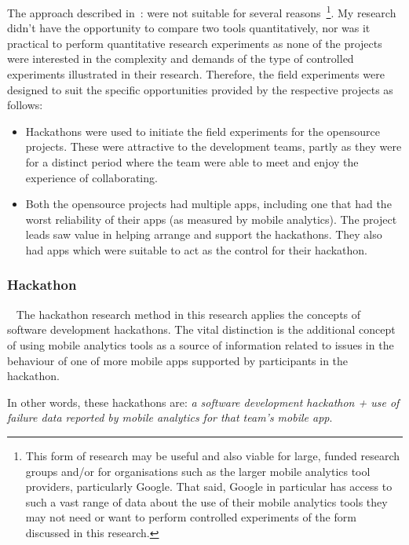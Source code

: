 The approach described in~\citep{Ko2015_a_practical_guide_to_controlled_experiments_of_sw_eng_tools_with_human_participants}: were not suitable for several reasons~\footnote{This form of research may be useful and also viable for large, funded research groups and/or for organisations such as the larger mobile analytics tool providers, particularly Google. That said, Google in particular has access to such a vast range of data about the use of their mobile analytics tools they may not need or want to perform controlled experiments of the form discussed in this research.}. 
%
My research didn't have the opportunity to compare two tools quantitatively, nor was it practical to perform quantitative research experiments as none of the projects were interested in the complexity and demands of the type of controlled experiments illustrated in their research. Therefore, the field experiments were designed to suit the specific opportunities provided by the respective projects as follows:
\begin{itemize}
    \item Hackathons were used to initiate the field experiments for the opensource projects. These were attractive to the development teams, partly as they were for a distinct period where the team were able to meet and enjoy the experience of collaborating.
    \item Both the opensource projects had multiple apps, including one that had the worst reliability of their apps (as measured by mobile analytics). The project leads saw value in helping arrange and support the hackathons. They also had apps which were suitable to act as the control for their hackathon. 
\end{itemize}

\subsubsection{Hackathon}~\label{section-hackathon-research-method}
The hackathon research method in this research applies the concepts of software development hackathons. The vital distinction is the additional concept of using mobile analytics tools as a source of information related to issues in the behaviour of one of more mobile apps supported by participants in the hackathon.

In other words, these hackathons are: \textit{a software development hackathon + use of failure data reported by mobile analytics for that team's mobile app}.

